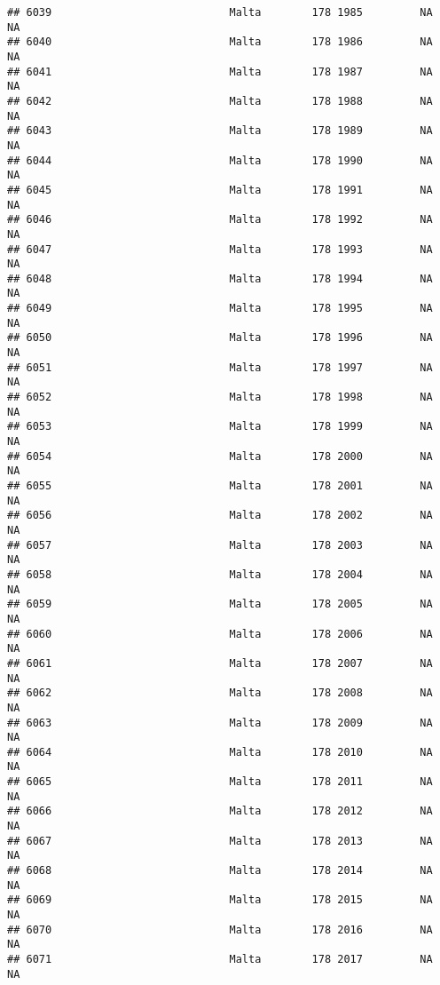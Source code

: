 \documentclass[
]{article}
\begin{document}
\begin{verbatim}
## 6039                            Malta        178 1985         NA         NA
## 6040                            Malta        178 1986         NA         NA
## 6041                            Malta        178 1987         NA         NA
## 6042                            Malta        178 1988         NA         NA
## 6043                            Malta        178 1989         NA         NA
## 6044                            Malta        178 1990         NA         NA
## 6045                            Malta        178 1991         NA         NA
## 6046                            Malta        178 1992         NA         NA
## 6047                            Malta        178 1993         NA         NA
## 6048                            Malta        178 1994         NA         NA
## 6049                            Malta        178 1995         NA         NA
## 6050                            Malta        178 1996         NA         NA
## 6051                            Malta        178 1997         NA         NA
## 6052                            Malta        178 1998         NA         NA
## 6053                            Malta        178 1999         NA         NA
## 6054                            Malta        178 2000         NA         NA
## 6055                            Malta        178 2001         NA         NA
## 6056                            Malta        178 2002         NA         NA
## 6057                            Malta        178 2003         NA         NA
## 6058                            Malta        178 2004         NA         NA
## 6059                            Malta        178 2005         NA         NA
## 6060                            Malta        178 2006         NA         NA
## 6061                            Malta        178 2007         NA         NA
## 6062                            Malta        178 2008         NA         NA
## 6063                            Malta        178 2009         NA         NA
## 6064                            Malta        178 2010         NA         NA
## 6065                            Malta        178 2011         NA         NA
## 6066                            Malta        178 2012         NA         NA
## 6067                            Malta        178 2013         NA         NA
## 6068                            Malta        178 2014         NA         NA
## 6069                            Malta        178 2015         NA         NA
## 6070                            Malta        178 2016         NA         NA
## 6071                            Malta        178 2017         NA         NA

\end{verbatim}
\end{document}

